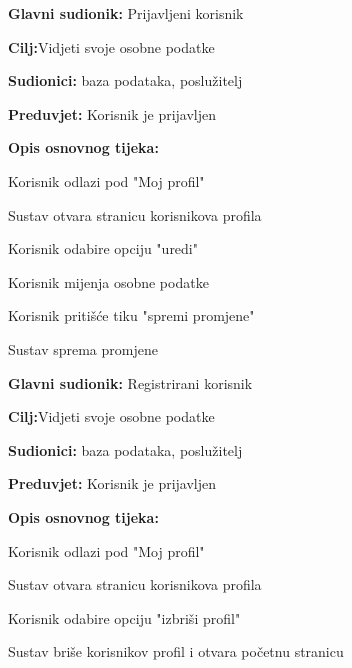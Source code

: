\noindent {}
\begin{packed_item}
	
	\item \textbf{Glavni sudionik: }Prijavljeni korisnik
	\item  \textbf{Cilj:}Vidjeti svoje osobne podatke
	\item  \textbf{Sudionici:} baza podataka, poslužitelj
	\item  \textbf{Preduvjet:} Korisnik je prijavljen
	\item  \textbf{Opis osnovnog tijeka:}
	
	\item[] \begin{packed_enum}
		
		\item Korisnik odlazi pod "Moj profil"
		\item Sustav otvara stranicu korisnikova profila 
		\item Korisnik odabire opciju "uredi"
		\item Korisnik mijenja osobne podatke
		\item Korisnik pritišće tiku "spremi promjene"
		\item Sustav sprema promjene 
		
	\end{packed_enum}
\end{packed_item}

\noindent {}
\begin{packed_item}
	
	\item \textbf{Glavni sudionik: }Registrirani korisnik
	\item  \textbf{Cilj:}Vidjeti svoje osobne podatke
	\item  \textbf{Sudionici:} baza podataka, poslužitelj
	\item  \textbf{Preduvjet:} Korisnik je prijavljen
	\item  \textbf{Opis osnovnog tijeka:}
	
	\item[] \begin{packed_enum}
		
		\item Korisnik odlazi pod "Moj profil"
		\item Sustav otvara stranicu korisnikova profila 
		\item Korisnik odabire opciju "izbriši profil"
		\item Sustav briše korisnikov profil i otvara početnu stranicu
		
	\end{packed_enum}
\end{packed_item}

